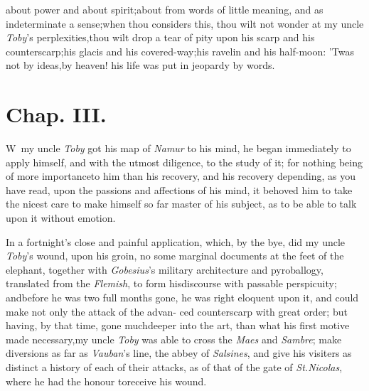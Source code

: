 \documentclass{article}
\begin{document}
\noindent
{}
about power and about spirit;\tsk about\pb
{}
from words of little meaning, and as
indeterminate a sense;\tsk when thou consi\-ders this, thou wilt not
wonder at my uncle \textit{Toby}’s perplexities,\tsk thou
wilt drop a tear of pity upon his scarp and his
counterscarp;\tsk his glacis and his covered-way;\tsk his
ravelin and his half-moon:\break
’Twas not by ideas,\tsh by heaven!\break
his life was put in jeopardy by words.

\bigskip

\section{Chap. III.}

\lettrine{W}{\,} my uncle \textit{Toby} got his map
of \textit{Namur} to his mind, he began immediately to apply himself,
and with the utmost diligence, to the study of it; for
nothing being of more importance\pb to him than his recovery, and his
recovery depending, as you have read, upon the passions and
affections of his mind, it behoved him to take the nicest care to
make himself so far master of his subject, as to be able to talk
upon it without emotion.

In a fortnight’s close and painful application, which, by
the bye, did my uncle \textit{Toby}’s wound, upon his groin, no
some marginal documents at the feet of the elephant, together with \textit{Gobesius}’s
mi\-litary architecture and pyroballogy,\break
translated from the
\textit{Flemish}, to form his\break discourse with passable perspicuity;
and\break before he was two full months gone,\tsk\break
he was right eloquent upon it, and could make not only the
attack of the advan-\pb 
ced counterscarp with great order;\tsh\break 
but having, by that time, gone much\break deeper into
the art, than what his first motive made necessary,\tsk my uncle \textit{Toby} was able
to cross the \textit{Maes} and \textit{Sambre}; make diversions as far as
\textit{Vauban}’s line, the abbey of \textit{Salsines}, \etc and give his visiters
as distinct a history of each of their attacks, as of that of the gate of
\textit{St.\@ Nicolas}, where he had the honour to\break receive his wound.
\end{document}
